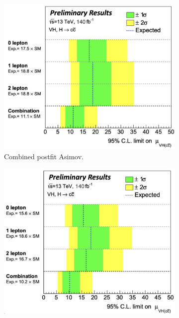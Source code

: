 \begin{figure}[h!]
    \centering
    \begin{subfigure}[b]{0.48\textwidth}
        \centering
        \includegraphics[width=\textwidth]{Images/VH/Fit/fromSlides/postfitVHcc.png}
        \caption{Combined postfit Asimov.}
        \label{fig:fit_new_vhcclimitPostfit}
    \end{subfigure}
    \begin{subfigure}[b]{0.48\textwidth}
      \centering
      \includegraphics[width=\textwidth]{Images/VH/Fit/fromSlides/prefitVHcc.png}

\end{subfigure}
\end{figure}
